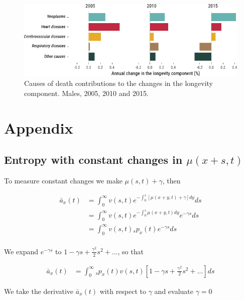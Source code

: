 \documentclass[12pt]{article}
\begin{document}
\begin{figure}[!ht]
	\centering
	\includegraphics[width=1\linewidth]{Fig/DescCod}
	\caption{{Causes of death contributions to the changes in the longevity component. Males, 2005, 2010 and 2015.}}
	\label{fig:Fig7}
\end{figure}


\FloatBarrier
\newpage
\appendix
\section{Appendix}

\subsection{Entropy with constant changes in $\mu(x+s,t)$}\label{sec:EntropyConst}

To measure constant changes we make $\mu(s,t)+\gamma$, then

\begin{equation}\label{eq:EntropyConst1}
\begin{split}
\bar{a}_{x}(t) &= \int_0^\infty{v}(s,t) e^{-\int_{0}^{s} [\mu(x+y,t)+\gamma]dy}ds \\
&= \int_0^\infty {v}(s,t)e^{-\int_{0}^{s} \mu(x+y,t)dy} e^{-\gamma s}ds \\
&= \int_0^\infty {v}(s,t){}_sp_x(t) e^{-\gamma s}ds \\
\end{split}
\end{equation}

We expand $e^{-\gamma s}$ to $1-\gamma s+\frac{\gamma^2}{2} s^{2} +...$, so that


\begin{equation}\label{eq:EntropyConst2}
\begin{split}
\bar{a}_{x}(t) &= \int_0^\infty {}_sp_x(t) {v}(s,t)[1-\gamma s+\frac{\gamma^2}{2} s^{2} +...]ds
\end{split}
\end{equation}

We take the derivative $\bar{a}_{x}(t)$ with respect to $\gamma$ and evaluate $\gamma=0$
\end{document}
